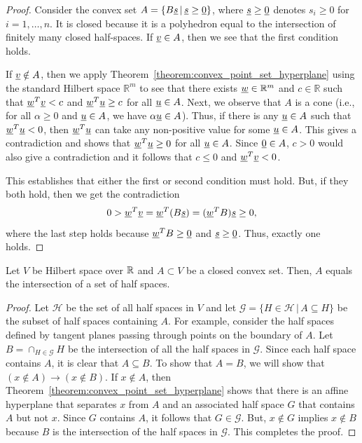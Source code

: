 \begin{proof}
Consider the convex set $A = \{B \underline{s} \, | \, \underline{s} \geq \underline{0} \}$, where $\underline{s} \geq \underline{0}$ denotes $s_i \geq 0$ for $i=1,\ldots,n$.
It is closed because it is a polyhedron equal to the intersection of finitely many closed half-spaces.
If $\underline{v} \in A$, then we see that the first condition holds.

If $\underline{v} \notin A$, then we apply Theorem~\ref{theorem:convex_point_set_hyperplane} using the standard Hilbert space $\mathbb{R}^m$ to see that there exists $\underline{w} \in \mathbb{R}^m$ and $c\in \mathbb{R}$ such that $\underline{w}^T \underline{v} < c$ and $\underline{w}^T \underline{u} \geq c$ for all $\underline{u} \in A$.
Next, we observe that $A$ is a cone (i.e., for all $\alpha \geq 0$ and $\underline{u} \in A$, we have $\alpha \underline{u} \in A$).
Thus, if there is any $\underline{u} \in A$ such that $\underline{w}^T \underline{u} < 0$,
then $\underline{w}^T \underline{u}$ can take any non-positive value for some $\underline{u} \in A$.
This gives a contradiction and shows that $\underline{w}^T \underline{u} \geq 0$ for all $\underline{u} \in A$.
Since $\underline{0} \in A$, $c>0$ would also give a contradiction and it follows that $c \leq 0$ and $\underline{w}^T \underline{v} < 0$.

This establishes that either the first or second condition must hold.
But, if they both hold, then we get the contradiction
\[ 0 > \underline{w}^T \underline{v} = \underline{w}^T (B \underline{s}) = (\underline{w}^T B) \underline{s} \geq 0, \]
where the last step holds because $\underline{w}^T B \geq \underline{0}$ and $\underline{s} \geq \underline{0}$.
Thus, exactly one holds.
\end{proof}

\begin{theorem}
Let $V$ be Hilbert space over $\mathbb{R}$ and $A \subset V$ be a closed convex set.
Then, $A$ equals the intersection of a set of half spaces.
\end{theorem}

\begin{proof}
Let $\mathcal{H}$ be the set of all half spaces in $V$ and let $\mathcal{G} = \{ H\in \mathcal{H} \,|\, A \subseteq H \}$  be the subset of half spaces containing $A$.
For example, consider the half spaces defined by tangent planes passing through points on the boundary of $A$.
Let $B= \cap_{H\in \mathcal{G}} H$ be the intersection of all the half spaces in $\mathcal{G}$.
Since each half space contains $A$, it is clear that $A\subseteq B$.
To show that $A = B$, we will show that $(x\notin A) \to (x\notin B)$.
If $x \notin A$, then Theorem~\ref{theorem:convex_point_set_hyperplane} shows that there is an affine hyperplane that separates $x$ from $A$ and an associated half space $G$ that contains $A$ but not $x$.
Since $G$ contains $A$, it follows that $G \in \mathcal{G}$.
But, $x \notin G$ implies $x \notin B$ because $B$ is the intersection of the half spaces in $\mathcal{G}$. 
This completes the proof.
\end{proof}

